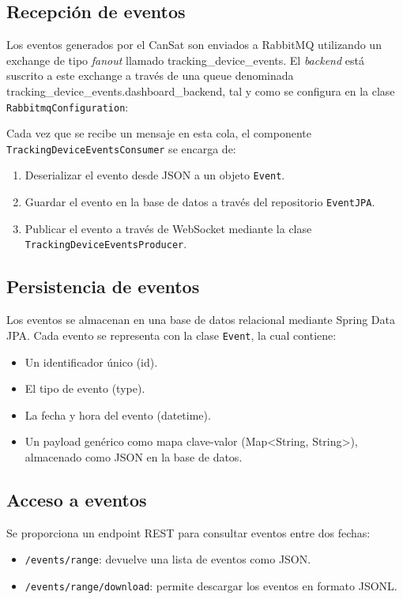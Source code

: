 \subsection{Recepción de eventos}

Los eventos generados por el CanSat son enviados a RabbitMQ utilizando un exchange de tipo \emph{fanout} llamado tracking\_device\_events.
El \emph{backend} está suscrito a este exchange a través de una queue denominada tracking\_device\_events.dashboard\_backend, tal y como se configura en la clase \texttt{RabbitmqConfiguration}:

Cada vez que se recibe un mensaje en esta cola, el componente \texttt{TrackingDeviceEventsConsumer} se encarga de:
\begin{enumerate}
    \item Deserializar el evento desde JSON a un objeto \texttt{Event}.
    \item Guardar el evento en la base de datos a través del repositorio \texttt{EventJPA}.
    \item Publicar el evento a través de WebSocket mediante la clase \texttt{TrackingDeviceEventsProducer}.
\end{enumerate}

\subsection{Persistencia de eventos}

Los eventos se almacenan en una base de datos relacional mediante Spring Data JPA. Cada evento se representa con la clase \texttt{Event}, la cual contiene:
\begin{itemize}
    \item Un identificador único (id).
    \item El tipo de evento (type).
    \item La fecha y hora del evento (datetime).
    \item Un payload genérico como mapa clave-valor (Map<String, String>), almacenado como JSON en la base de datos.
\end{itemize}

\subsection{Acceso a eventos}

Se proporciona un endpoint REST para consultar eventos entre dos fechas:
\begin{itemize}
    \item \texttt{/events/range}: devuelve una lista de eventos como JSON.
    \item \texttt{/events/range/download}: permite descargar los eventos en formato JSONL.
\end{itemize}

